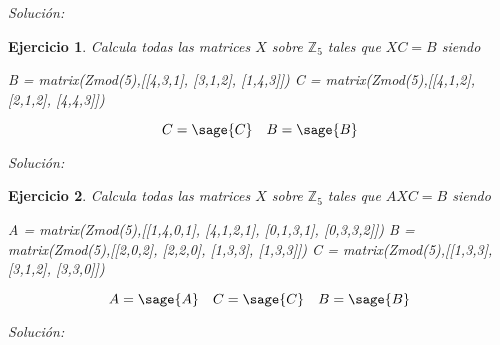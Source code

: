 \documentclass{amsart}
\newtheorem{ejer}{Ejercicio}
\begin{document}
{\it Solución:} 



\begin{ejer}
Calcula todas las matrices $X$ sobre ${\mathbb Z}_5$ tales que $XC = B$ siendo

\begin{sageblock}
B =  matrix(Zmod(5),[[4,3,1],
[3,1,2],
[1,4,3]])
C =  matrix(Zmod(5),[[4,1,2],
[2,1,2],
[4,4,3]])
\end{sageblock}

$$ C = \sage{C} \quad B = \sage{B} $$
\end{ejer}

{\it Solución:} 



\begin{ejer}
Calcula todas las matrices $X$ sobre ${\mathbb Z}_5$ tales que $AXC = B$ siendo

\begin{sageblock}
A =  matrix(Zmod(5),[[1,4,0,1],
[4,1,2,1],
[0,1,3,1],
[0,3,3,2]])
B =  matrix(Zmod(5),[[2,0,2],
[2,2,0],
[1,3,3],
[1,3,3]])
C =  matrix(Zmod(5),[[1,3,3],
[3,1,2],
[3,3,0]])
\end{sageblock}

$$ A = \sage{A} \quad C = \sage{C} \quad B = \sage{B} $$
\end{ejer}

{\it Solución:} 


\end{document}
